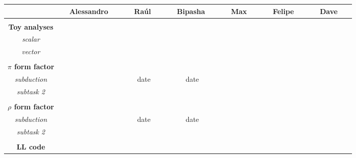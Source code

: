 \begin{center}
  \begin{tabular}{ c | c | c | c | c | c | c  }
    \hline
                           & \ \ Alessandro \ \  & \ \  Ra\'ul \ \  & \ \ Bipasha \ \  & \ \  Max \ \  & \ \  Felipe \ \  & \ \  Dave \ \   \\ \hline \\[-10pt] \hline
%
{\bf Toy analyses} &                          &                      &                        &                   &                    &                      \\ \hline
{\em scalar}        &                            &                      &                        &                   &                     &                        \\ \hline
{\em vector}        &                            &                      &                        &                   &                     &                       \\ \hline \\[-10pt] \hline
%
 {\bf $\pi$ form factor}&                     &                      &                        &                   &                     &                      \\ \hline
 {\em subduction}  &                          & date              & date                &                   &                     &                      \\ \hline
 {\em subtask 2}  &                            &                      &                        &                   &                     &                      \\ \hline \\[-10pt] \hline
%
{\bf $\rho$ form factor} &                  &                      &                        &                   &                    &                      \\ \hline
{\em subduction}      &                      & date              & date                &                   &                     &                        \\ \hline
{\em subtask 2}        &                      &                      &                        &                   &                     &                       \\ \hline \\[-10pt] \hline  
%
{\bf LL code}       &                            &                      &                        &                   &                     &                      \\ \hline

\end{tabular}
\end{center}
